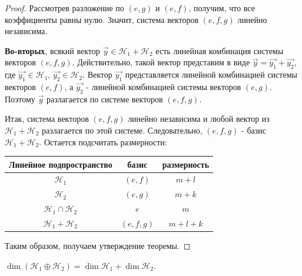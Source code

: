 \begin{proof}
    Рассмотрев разложение по $(e, g)$ и $(e, f)$, получим, что все коэффициенты равны нулю. Значит, система векторов $(e, f, g)$ линейно независима.

    \textbf{Во-вторых}, всякий вектор $\vec{y} \in \mathcal{H}_1 + \mathcal{H}_2$ есть линейная комбинация системы векторов $(e, f, g)$. Действительно, такой вектор представим в виде $\vec{y} = \vec{y_1} + \vec{y_2}$, где $\vec{y_1} \in \mathcal{H}_1$, $\vec{y_2} \in \mathcal{H}_2$. Вектор $\vec{y_1}$ представляется линейной комбинацией системы векторов $(e, f)$, а $\vec{y_2}$ - линейной комбинацией системы векторов $(e, g)$. Поэтому $\vec{y}$ разлагается по системе векторов $(e, f, g)$.

    Итак, система векторов $(e, f, g)$ линейно независима и любой вектор из $\mathcal{H}_1 + \mathcal{H}_2$ разлагается по этой системе. Следовательно, $(e, f, g)$ - базис $\mathcal{H}_1 + \mathcal{H}_2$. Остается подсчитать размерности:
    
    \begin{table}[H]
        \centering
        \begin{tabular}{|c|c|c|}
            \hline
            Линейное подпространство & базис & размерность\\
            \hline
            $\mathcal{H}_1$ & $(e, f)$ & $m + l$\\
            \hline
            $\mathcal{H}_2$ & $(e, g)$ & $m + k$\\
            \hline
            $\mathcal{H}_1 \cap \mathcal{H}_2$ & $e$ & $m$\\
            \hline
            $\mathcal{H}_1 + \mathcal{H}_2$ & $(e, f, g)$ & $m + l + k$\\
            \hline
        \end{tabular}
        \label{tab:my_label}
    \end{table}
    Таким образом, получаем утверждение теоремы.
\end{proof}

\begin{corollary}
    $\dim(\mathcal{H}_1 \oplus \mathcal{H}_2) = \dim \mathcal{H}_1 + \dim \mathcal{H}_2.$
    \label{cor:corollary_4_6}
\end{corollary}
